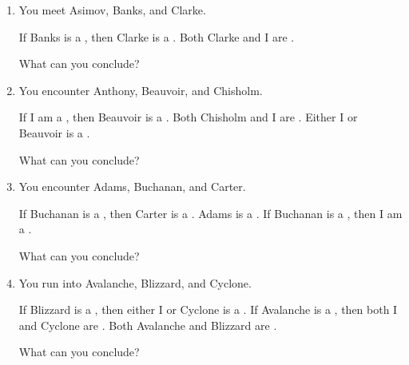 \probsec{~\ref{sec:conditionals}}
\begin{enumerate}
    \item You meet Asimov, Banks, and Clarke.
  \begin{dialogue}
     If Banks is a \knight, then Clarke is a \knave.
     Both Clarke and I are \knaves.
  \end{dialogue}
  What can you conclude?

    \item You encounter Anthony, Beauvoir, and Chisholm.
  \begin{dialogue}
     If I am a \knave, then Beauvoir is a \knight.
     Both Chisholm and I are \knights.
     Either I or Beauvoir is a \knave.
  \end{dialogue}
  What can you conclude?

    \item You encounter Adams, Buchanan, and Carter.
  \begin{dialogue}
     If Buchanan is a \knight, then Carter is a \knave.
     Adams is a \knave.
     If Buchanan is a \knight, then I am a \knave.
  \end{dialogue}
  What can you conclude?

    \item You run into Avalanche, Blizzard, and Cyclone.
  \begin{dialogue}
     If Blizzard is a \knight, then either I or Cyclone is a \knave.
     If Avalanche is a \knave, then both I and Cyclone are \knights.
     Both Avalanche and Blizzard are \knaves.
  \end{dialogue}
  What can you conclude?
\end{enumerate}
